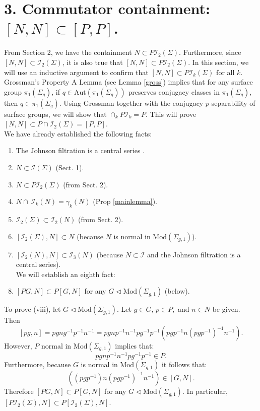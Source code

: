 \documentclass[a4paper]{amsproc}
\theoremstyle{TheoremNum}
\theoremstyle{Theorembold}
\theoremstyle{TheoremboldDef}
\theoremstyle{TheoremboldRem}
\theoremstyle{TheoremboldRem}
\begin{document}
\section*{3. Commutator containment: $[N,N]\subset[P,P]$.}
\addtocounter{section}{1}
\setcounter{subsection}{0}
From Section 2, we have the containment $N\subset P{{\mathcal{I}}_2(\Sigma)}$. Furthermore, since $[N,N]\subset {{\mathcal{I}}_2(\Sigma)}$, it is also true that $[N,N]\subset P{{\mathcal{I}}_2(\Sigma)}$. In this section, we will use an inductive argument to confirm that $[N,N]\subset P{{\mathcal{I}}_k(\Sigma)}$ for all $k$. Grossman's Property A Lemma (see Lemma \ref{gross}) implies that for any surface group ${\pi_1(\Sigma_g)}$, if $q\in \text{Aut}({\pi_1(\Sigma_g)})$ preserves conjugacy classes in ${\pi_1(\Sigma_g)}$, then $q\in {\pi_1(\Sigma_g)}$.  Using Grossman together with the conjugacy $p$-separability of surface groups, we will show that $\cap_k P{\mathcal{I}}_k=P$. This will prove $[N,N]\subset P\cap{{\mathcal{I}}_2(\Sigma)}=[P,P]$.\\

\noindent We have already established the following facts:
\begin{enumerate}[label=\roman*.]
\item\label{centra} The Johnson filtration is a central series \cite{basslub}.
\item\label{NinTorelli} $N\subset {{\mathcal{I}}(\Sigma)}$ (Sect. 1).
\item\label{Niat} $N\subset P{{\mathcal{I}}_2(\Sigma)}$ (from Sect. 2).
\item\label{intersectionofN} $N\cap\ {{\mathcal{I}}_k(N)} =\gamma_k(N)$ (Prop \ref{mainlemma}).
\item\label{iatiniatn} ${{\mathcal{I}}_2(\Sigma)}\subset{{\mathcal{I}}_2(N)}$ (from Sect. 2).

\item\label{normal} $[{{\mathcal{I}}_2(\Sigma)},N]\subset N$ (because $N$ is normal in ${\text{Mod}(\Sigma_{g,1})}$).
\item $[{{\mathcal{I}}_2(N)},N]\subset {\mathcal{I}}_3(N)$ (because $N\subset {\mathcal{I}}$ and the Johnson filtration is a central series).\\

\noindent We will establish an eighth fact:
\item\label{pulloutp} $[PG,N]\subset P[G,N]$ for any $G\triangleleft{\text{Mod}(\Sigma_{g,1})}$ (below).\\

\end{enumerate}
To prove (viii), let $G\triangleleft{\text{Mod}(\Sigma_{g,1})}$. Let $g\in G$, $p\in P,$ and $  n\in N$ be given. Then \[[pg,n]=pgng^{-1}p^{-1}n^{-1}=pgnp^{-1}n^{-1}pg^{-1}p^{-1}(pgp^{-1}n(pgp^{-1})^{-1}n^{-1}).\] However, $P$ normal in ${\text{Mod}(\Sigma_{g,1})}$ implies that: \[pgnp^{-1}n^{-1}pg^{-1}p^{-1}\in P.\] Furthermore, because $G$ is normal in ${\text{Mod}(\Sigma_{g,1})}$ it follows that: \[((pgp^{-1})n(pgp^{-1})^{-1}n^{-1})\in [G,N].\]  Therefore $[PG,N]\subset P[G,N]$ for any $G\triangleleft{\text{Mod}(\Sigma_{g,1})}$. In particular, $[P{{\mathcal{I}}_2(\Sigma)},N]\subset P[{{\mathcal{I}}_2(\Sigma)},N]$.\\
\end{document}
